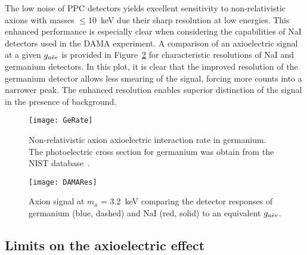 The low noise of PPC detectors yields excellent sensitivity to non-relativistic axions with masses $\leq10$~keV due their sharp resolution at low energies.  This enhanced performance is especially clear when considering the capabilities of NaI detectors used in the DAMA experiment.  A comparison of an axioelectric signal at a given $g_{a\bar{e}e}$ is provided in Figure~\ref{fig:ResCompare} for characteristic resolutions of NaI and germanium detectors.  In this plot, it is clear that the improved resolution of the germanium detector allows less smearing of the signal, forcing more counts into a narrower peak.  The enhanced resolution enables superior distinction of the signal in the presence of background.

		\begin{figure}
			\centering
			\texttt{[image: GeRate]}
			\caption[Axioelectric interaction rate in germanium]{Non-relativistic axion axioelectric 
			interaction rate in germanium.  The photoelectric cross section for germanium was obtain
			from the NIST database~\cite{chantler:597}.}
			\label{fig:HeavyAxionSignalRate}
		\end{figure}

		\begin{figure}
			\centering
			\texttt{[image: DAMARes]}
			\caption[Axion signal at $m_{a}$ = 3.2~keV]{Axion signal at $m_{a}$ = 3.2~keV comparing 
			the detector responses of germanium (blue, dashed) and NaI (red, solid) to an equivalent
			$g_{a\bar{e}e}$.  }
			\label{fig:ResCompare}
		\end{figure}

	\subsection{Limits on the axioelectric effect}
	\label{sec:CalcLimitsOnHeavyAxionLimits}		
		
